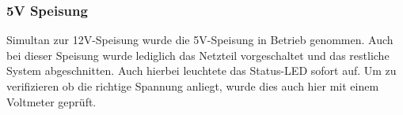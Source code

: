 \subsubsection{5V Speisung}
\label{subsubsec:Inbetriebnahme_5V_Speisungen}

Simultan zur 12V-Speisung wurde die 5V-Speisung in Betrieb genommen. Auch bei dieser Speisung wurde lediglich das Netzteil vorgeschaltet und das restliche System abgeschnitten. Auch hierbei leuchtete das Status-LED sofort auf. Um zu verifizieren ob die richtige Spannung anliegt, wurde dies auch hier mit einem Voltmeter geprüft.